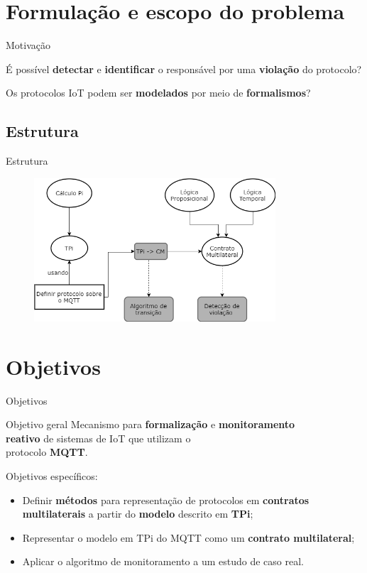\documentclass[12pt,xcolor={usenames,dvipsnames}]{beamer}
\begin{document}
\section{Formulação e escopo do problema}
\begin{frame}{Motivação}
\begin{alertblock}{}
É possível \textbf{detectar} e \textbf{identificar} o responsável por uma \textbf{violação} do protocolo?
\end{alertblock}
\quad
\begin{alertblock}{}
	Os protocolos IoT podem ser \textbf{modelados} por meio de \textbf{formalismos}?
\end{alertblock}

\end{frame}

\subsection{Estrutura}
\begin{frame}{Estrutura}
\begin{figure}[ht]
	\centering
	\includegraphics[width=9cm]{./figuras/tcc_estrutura.png}
\end{figure}  
\end{frame}

\section{Objetivos}
\begin{frame}{Objetivos}

\begin{beamerboxesrounded}{Objetivo geral}
Mecanismo para \textbf{formalização} e \textbf{monitoramento \\
	reativo} de sistemas de IoT que utilizam o \\protocolo \textbf{MQTT}.
\end{beamerboxesrounded}
Objetivos específicos:
\begin{itemize}
	\item Definir \textbf{métodos} para representação de protocolos em \textbf{contratos multilaterais} a partir do \textbf{modelo} descrito em \textbf{TPi};
	\item Representar o modelo em TPi do MQTT como um \textbf{contrato multilateral};
	\item Aplicar o algoritmo de monitoramento a um estudo de caso real.
\end{itemize}
\end{frame}
\end{document}
